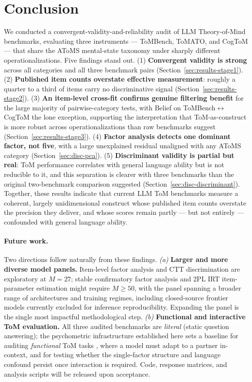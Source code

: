 \documentclass{article} %
\begin{document}
\section{Conclusion}
\label{sec:conclusion}

We conducted a convergent-validity-and-reliability audit of LLM Theory-of-Mind benchmarks, evaluating three instruments --- ToMBench, ToMATO, and CogToM --- that share the AToMS mental-state taxonomy under sharply different operationalizations. Five findings stand out. (1) \textbf{Convergent validity is strong} across all categories and all three benchmark pairs (Section~\ref{sec:results-stage1}). (2) \textbf{Published item counts overstate effective measurement}: roughly a quarter to a third of items carry no discriminative signal (Section~\ref{sec:results-stage2}). (3) \textbf{An item-level cross-fit confirms genuine filtering benefit} for the large majority of pairwise-category tests, with Belief on ToMBench$\leftrightarrow$CogToM the lone exception, supporting the interpretation that ToM-as-construct is more robust across operationalizations than raw benchmarks suggest (Section~\ref{sec:results-stage3}). (4) \textbf{Factor analysis detects one dominant factor, not five}, with a large unexplained residual unaligned with any AToMS category (Section~\ref{sec:disc-pca}). (5) \textbf{Discriminant validity is partial but real}: ToM performance correlates with general language ability but is not reducible to it, and this separation is clearer with three benchmarks than the original two-benchmark comparison suggested (Section~\ref{sec:disc-discriminant}). Together, these results indicate that current LLM ToM benchmarks measure a coherent, largely unidimensional construct whose published item counts overstate the precision they deliver, and whose scores remain partly --- but not entirely --- confounded with general language ability.
 
\paragraph{Future work.} Two directions follow naturally from these findings. \emph{(a)} \textbf{Larger and more diverse model panels.} Item-level factor analysis and CTT discrimination are exploratory at $M=27$; stable confirmatory factor analysis and 2PL IRT item-parameter estimation might require $M\ge 50$, with the panel spanning a broader range of architectures and training regimes, including closed-source frontier models currently excluded for inference reproducibility. Expanding the panel is the single most impactful methodological step. \emph{(b)} \textbf{Functional and interactive ToM evaluation.} All three audited benchmarks are \emph{literal} (static question answering); the psychometric infrastructure established here sets a baseline for auditing \emph{functional} ToM tasks \citep{riemer2024position}, where a model must adapt to a partner in-context, and for testing whether the single-factor structure and language confound persist once interaction is required. Code, response matrices, and analysis scripts will be released upon acceptance.
 
\end{document}
